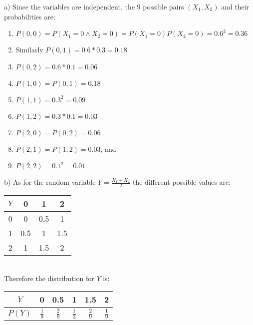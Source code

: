 \documentclass[boxes, qed]{homework}
\begin{document}
\begin{solution}a) Since the variables are independent,
  the $9$ possible pairs $(X_1,X_2)$ and their probabilities are:
  \begin{enumerate}
    \item $P(0,0)=P(X_1=0 \land X_2=0)=P(X_1=0)P(X_2=0)=0.6^2=0.36$
    \item Similarly $P(0,1)=0.6*0.3=0.18$
    \item $P(0,2)=0.6*0.1=0.06$
    \item $P(1,0)=P(0,1)=0.18$
    \item $P(1,1)=0.3^2=0.09$
    \item $P(1,2)=0.3*0.1=0.03$
    \item $P(2,0)=P(0,2)=0.06$
    \item $P(2,1)=P(1,2)=0.03$, and
    \item $P(2,2)=0.1^2=0.01$\\
  \end{enumerate}

  b) As for the random variable $Y=\frac{X_1+X_2}{2}$
  the different possible values are:\\
  
  \begin{tabular}{|c|c|c|c|}
    \hline
    $Y$ & 0 & 1 & 2 \\
    \hline
    0 & 0 & 0.5 & 1 \\
    \hline
    1 & 0.5 & 1 & 1.5 \\
    \hline
    2 & 1 & 1.5 & 2 \\
    \hline
  \end{tabular}\\

  Therefore the distribution for $Y$ is:\\
  
  \begin{tabular}{|c|c|c|c|c|c|}
    \hline
    $Y$ & 0 & 0.5 & 1 & 1.5 & 2\\
    \hline
    $P(Y)$ & $\frac{1}{9}$ & $\frac{2}{9}$ & $\frac{1}{3}$ & $\frac{2}{9}$ & $\frac{1}{9}$\\
    \hline
  \end{tabular}
\end{solution}
\end{document}
